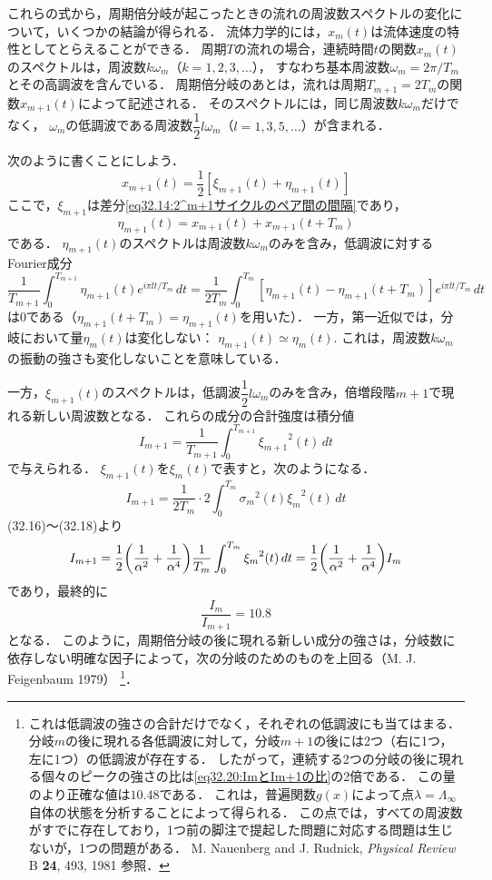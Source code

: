 これらの式から，周期倍分岐が起こったときの流れの周波数スペクトルの変化について，いくつかの結論が得られる．
流体力学的には，$x_m(t)$は流体速度の特性としてとらえることができる．
周期$T$の流れの場合，連続時間$t$の関数$x_m(t)$のスペクトルは，周波数$k\omega_m$（$k=1,2,3,\ldots$），
すなわち基本周波数$\omega_m=2\pi/T_m$とその高調波を含んでいる．
周期倍分岐のあとは，流れは周期$T_{m+1}=2T_m$の関数$x_{m+1}(t)$によって記述される．
そのスペクトルには，同じ周波数$k\omega_m$だけでなく，
$\omega_m$の低調波である周波数$\dfrac{1}{2}l\omega_m$（$l=1,3,5,\ldots$）が含まれる．



次のように書くことにしよう．
\[
    x_{m+1}(t) = \frac{1}{2} [ \xi_{m+1}(t) + \eta_{m+1}(t) ]
\]
ここで，$\xi_{m+1}$は差分\eqref{eq32.14:2^m+1サイクルのペア間の間隔}であり，
\[
    \eta_{m+1}(t) = x_{m+1}(t) + x_{m+1}(t+T_m)
\]
である．
$\eta_{m+1}(t)$のスペクトルは周波数$k\omega_m$のみを含み，低調波に対するFourier成分
\[
    \frac{1}{T_{m+1}} \int_0^{T_{m+1}} \eta_{m+1}(t) e^{i\pi lt/T_m} \, dt
    = \frac{1}{2T_m} \int_0^{T_m} [ \eta_{m+1}(t)-\eta_{m+1}(t+T_m) ] e^{i\pi lt/T_m} \, dt
\]
は0である（$\eta_{m+1}(t+T_m)=\eta_{m+1}(t)$を用いた）．
一方，第一近似では，分岐において量$\eta_m(t)$は変化しない：
$\eta_{m+1}(t) \simeq \eta_m(t).$
これは，周波数$k\omega_m$の振動の強さも変化しないことを意味している．



一方，$\xi_{m+1}(t)$のスペクトルは，低調波$\dfrac{1}{2}l \omega_m$のみを含み，倍増段階$m+1$で現れる新しい周波数となる．
これらの成分の合計強度は積分値
\begin{equation}
    I_{m+1} = \frac{1}{T_{m+1}} \int_0^{T_{m+1}} {\xi_{m+1}}^2(t) \, dt
\end{equation}
で与えられる．
$\xi_{m+1}(t)$を$\xi_m(t)$で表すと，次のようになる．
\[
    I_{m+1} = \frac{1}{2T_m} \cdot 2\int_0^{T_m} {\sigma_m}^2(t) {\xi_m}^2(t) \, dt
\]
(32.16)〜(32.18)より
\[
    I_{m+1} = \frac{1}{2} \pqty{ \frac{1}{\alpha^2} + \frac{1}{\alpha^4} } \frac{1}{T_m} \int_0^{T_m} {\xi_m}^2(t) \, dt
    = \frac{1}{2} \pqty{ \frac{1}{\alpha^2} + \frac{1}{\alpha^4} } I_m
\]
であり，最終的に
\begin{equation}\label{eq32.20:ImとIm+1の比}
    \frac{I_m}{I_{m+1}} = 10.8
\end{equation}
となる．
このように，周期倍分岐の後に現れる新しい成分の強さは，分岐数に依存しない明確な因子によって，次の分岐のためのものを上回る（M. J. Feigenbaum 1979）
\footnote{
これは低調波の強さの合計だけでなく，それぞれの低調波にも当てはまる．
分岐$m$の後に現れる各低調波に対して，分岐$m+1$の後には2つ（右に1つ，左に1つ）の低調波が存在する．
したがって，連続する2つの分岐の後に現れる個々のピークの強さの比は\eqref{eq32.20:ImとIm+1の比}の2倍である．
この量のより正確な値は$10.48$である．
これは，普遍関数$g(x)$によって点$\lambda=\Lambda_\infty$自体の状態を分析することによって得られる．
この点では，すべての周波数がすでに存在しており，1つ前の脚注で提起した問題に対応する問題は生じないが，1つの問題がある．
M. Nauenberg and J. Rudnick, \textit{Physical Review} B \textbf{24}, 493, 1981
参照．
}．




